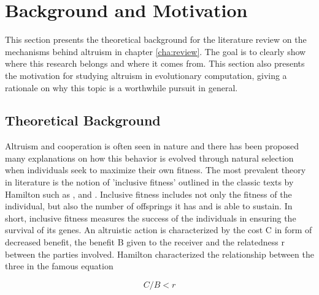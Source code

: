 \documentclass[a4paper]{book}
\begin{document}
\section{Background and Motivation}\label{cit}
\label{sec:BackgroundAndMotivation}

This section presents the theoretical background for the literature review on the mechanisms behind altruism in chapter \ref{cha:review}. The goal is to clearly show where this research belongs and where it comes from. This section also presents the motivation for studying altruism in evolutionary computation, giving a rationale on why this topic is a worthwhile pursuit in general.

\subsection{Theoretical Background}

Altruism and cooperation is often seen in nature and there has been proposed many explanations on how this behavior is evolved through natural selection when individuals seek to maximize their own fitness.
The most prevalent theory in literature is the notion of 'inclusive fitness' outlined in the classic texts by Hamilton such as \cite{w._d._hamilton_evolution_1963}, \cite{hamilton_genetical_1964-1} and \cite{hamilton_genetical_1964}.
Inclusive fitness includes not only the fitness of the individual, but also the number of offsprings it has and is able to sustain. In short, inclusive fitness measures the success of the individuals in ensuring the survival of its genes. 
An altruistic action is characterized by the cost C in form of decreased benefit, the benefit B given to the receiver and the relatedness r between the parties involved. Hamilton characterized the relationship between the three in the famous equation


\begin{equation}
\label{eq:hamilton}
C/B < r
\end{equation}
\end{document}
